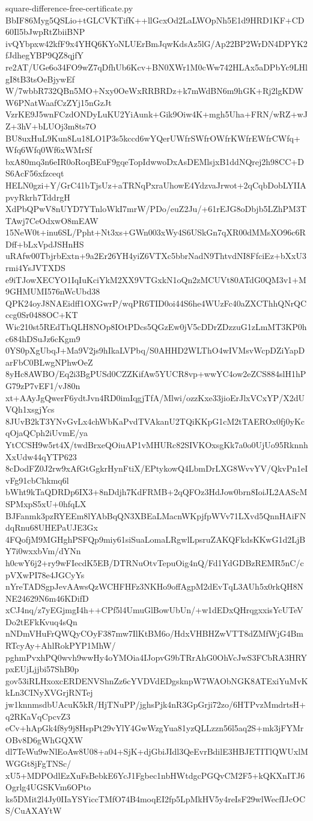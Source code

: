 \documentclass[11pt]{article}
\theoremstyle{definition}
\theoremstyle{remark}
\begin{document}
\begin{filecontents*}[overwrite]{square-difference-free-certificate.py}
BbIF86Myg5QSLio+tGLCVKTifK++llGcxOd2LaLWOpNh5E1d9HRD1KF+CD60Il5bJwpRtZbiiBNP
ivQYbpxw42kfF9x4YHQ6KYoNLUErBmJqwKdsAz5lG/Ap22BP2WrDN4DPYK2fJdhegYBP9QZ8qjfY
re2AT/UGe6o34FO9wZ7qDfhUb6Kcv+BN0XWr1M0cWw742HLAx5aDPbYc9LHlgI8tB3tsOeBjywEf
W/7wbbR732QBn5MO+Nxy0OeWxRRBRDz+k7mWdBN6m9hGK+Rj2lgKDWW6PNatWaafCzZYj15nGzJt
VzrKE9J5wnFCzdONDyLuKU2YiAunk+Gik9Oiw4K+mgh5Uha+FRN/wRZ+wJZ+3hV+bLUOj3m8ts7O
BU8uxHuL9Kun8Lu18LO1P3s5kccd6wYQerUWfrSWfrOWfrKWfrEWfrCWfq+Wfq6Wfq0Wf6xWMrSf
bxA80mq3n6eIR0oRoqBEuF9gqeTopIdwwoDxAsDEMlsjxB1ddNQrej2h98CC+DS6AcF56xfzceqt
HELN0gzi+Y/GrC41bTjsUz+aTRNqPxraUhowE4YdzvaJrwot+2qCqbDobLYIIApvyRkrh7TddrgH
XdPbQPwV8nUYD7YTnloWkI7mrW/PDo/euZ2Ju/+61rEJG8oDbjb5LZhPM3TTAwj7CeOdxwO8mEAW
15NeW0t+inu6SL/Ppht+Nt3xs+GWn003xWy4S6USkGn7qXR00dMMsXO96c6RDff+bLxVpdJSHnHS
uRAfw00TbjrbExtn+9a2Er26YH4yiZ6VTXc5bbrNadN9ThtvdNI8FfciEz+bXxU3rmi4YsJVTXDS
e9iTJowXECYO1IqIuKciYkM2XX9VTGxkN1oQn2zMCUVt80ATdG0QM3v1+M9GHMUMI576nWcUbd38
QPK24oyJ8NAEidff1OXGwrP/wqPR6TID0oi44S6he4WUzFc40aZXCThhQNrQCccg0Sr0488OC+KT
Wic210st5REdThQLH8NOp8IOtPDcs5QGzEw0jV5cDDrZDzzuG1zLmMT3KP0hc684hDSuJz6cKgm9
0YS0pXgUbqJ+Ma9V2js9hIkaLVPbq/S0AHHD2WLThO4wIVMsvWcpDZiYapDarFbC0BLwgNPhwOeZ
8yHc8AWBO/Eq2i3BgPUSd0CZZKifAw5YUCR8vp+wwYC4ow2eZCS884slH1hPG79zP7vEF1/vJ80n
xt+AAyJgQwerF6ydtJvn4RD0imIqgjTfA/Mlwi/ozzKxe33jioErJlxVCxYP/X2dUVQh1xsgjYcs
8JUvB2kT3YNvGvLx4chWbKaPvdTVAkanU2TQiKKpG1cM2tTAEROx0fj0yKcqOjaQCph2iUvmE/ya
YtCCSH9w5rt4X/twdBrxeQOiuAP1vMHURc82SIVKOxsgKk7a0o0UjUo95RknnhXxUdw44qYTP623
8cDodFZ0J2rw9xAfGtGgkrHynFtiX/EPtykowQ4LbmDrLXG8WvvYV/QkvPn1eIvFg91cbChkmq6l
bWht9kTaQDRDp6IX3+8nDdjh7KdFRMB+2qQFOz3HdJow0brn8IoiJL2AAScMSPMxpS5xU+0hfqLX
BJFanmk3pzRYEEm8lYAbBqQN3XBEaLMacnWKpjfpWVv71LXvd5QnnHAiFNdqRnu68UHEPaUJE3Gx
4FQofjM9MGHghPSFQp9miy61siSuaLomaLRgwlLpsruZAKQFkdsKKwG1d2LjBY7i0wxxbVm/dYNn
h0cwY6j2+ry9wFIecdK5EB/DTRNuOtvTepuOig4nQ/Fd1YdGDBzREMR5nC/cpVXwPI78e4JGCyYs
nYreTADSgpJevAAwsQzWCHFHFz3NKHo9offAgpM2dEvTqL3AUh5x0rkQH8NNE24629N6m46KDifD
xCJ4nq/z7yEGjmgI4h++CPf5l4UmuGlBowUbUn/+w1dEDxQHrqgxxisYcUTeVDo2tEFkKvuq4sQn
nNDmVHuFrQWQyCOyF387mw7IlKtBM6o/HdxVHBHZwVTT8dZMfWjG4BmRTcyAy+AhlRokPYP1MhW/
pghmPvxhPQ0wvh9wwHy4oYMOia4IJopvG9bTRrAhG0OhVcJwS3FCbRA3HRYpxEUjLjjbi57ShB0p
gov53iRLHxoxcERDENVShnZz6cYVDVdEDgsknpW7WAObNGK8ATExiYuMvKkLn3CINyXVGrjRNTej
jw1knnmsdbUAcuK5kR/HjTNuPP/jghsPjk4nR3GpGrji72zo/6HTPvzMmdrtsH+q2RKaVqCpcvZ3
eCv+hApGk4f8y9j8HspPt29vYlY4GwWzgYua81yzQLLzzn56l5aq2S+mk3jFYMrOBv8D6gWhGQXW
dl7TeWu9wNlEoAw8U08+a04+SjK+djGbiJIdl3QeEvrBdilE3HBJETITlQWUxlMWGGt8jFgTNSc/
xU5+MDPOdlEzXuFsBebkE6YcJ1Fgbec1nbHWtdgcPGQvCM2F5+kQKXnITJ6Ogrlg4UGSKVm6OPto
ks5DMit2l4Jy0IIaYSYiccTMfO74B4moqEI2fp5LpMkHV5y4reIsF29wlWecfIJcOCS/CuAXAYtW

\end{filecontents*}
\end{document}
